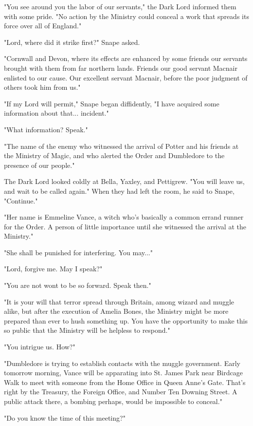 \documentclass[a4paper,11pt]{article}
\begin{document}
"You see around you the labor of our servants," the Dark Lord informed them with some pride. "No action by the Ministry could conceal a work that spreads its force over all of England."

"Lord, where did it strike first?" Snape asked.

"Cornwall and Devon, where its effects are enhanced by some friends our servants brought with them from far northern lands. Friends our good servant Macnair enlisted to our cause. Our excellent servant Macnair, before the poor judgment of others took him from us."

"If my Lord will permit," Snape began diffidently, "I have acquired some information about that... incident."

"What information? Speak."

"The name of the enemy who witnessed the arrival of Potter and his friends at the Ministry of Magic, and who alerted the Order and Dumbledore to the presence of our people."

The Dark Lord looked coldly at Bella, Yaxley, and Pettigrew. "You will leave us, and wait to be called again." When they had left the room, he said to Snape, "Continue."

"Her name is Emmeline Vance, a witch who's basically a common errand runner for the Order. A person of little importance until she witnessed the arrival at the Ministry."

"She shall be punished for interfering. You may..."

"Lord, forgive me. May I speak?"

"You are not wont to be so forward. Speak then."

"It is your will that terror spread through Britain, among wizard and muggle alike, but after the execution of Amelia Bones, the Ministry might be more prepared than ever to hush something up. You have the opportunity to make this so public that the Ministry will be helpless to respond."

"You intrigue us. How?"

"Dumbledore is trying to establish contacts with the muggle government. Early tomorrow morning, Vance will be apparating into St. James Park near Birdcage Walk to meet with someone from the Home Office in Queen Anne's Gate. That's right by the Treasury, the Foreign Office, and Number Ten Downing Street. A public attack there, a bombing perhaps, would be impossible to conceal."

"Do you know the time of this meeting?"
\end{document}

